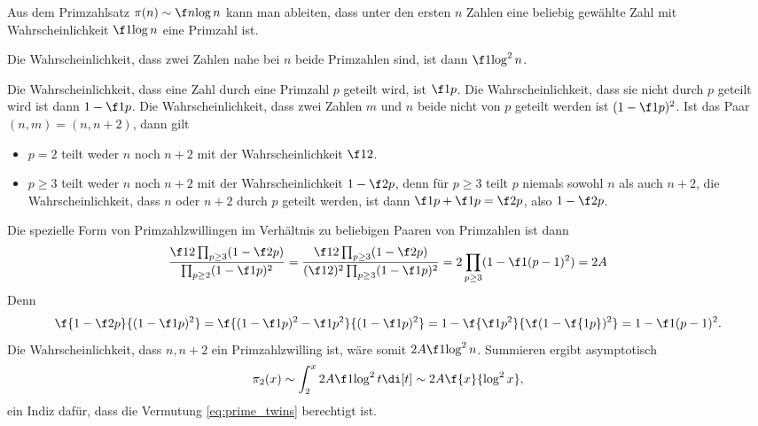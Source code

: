 \begin{nt} \label{7.13}
	Aus dem Primzahlsatz $\pi(n) \sim \f n{\log n}$ kann man ableiten, dass unter den ersten $n$ Zahlen eine beliebig gewählte Zahl mit Wahrscheinlichkeit $\f 1{\log n}$ eine Primzahl ist.

	Die Wahrscheinlichkeit, dass zwei Zahlen nahe bei $n$ beide Primzahlen sind, ist dann $\f 1{\log^2 n}$.

	Die Wahrscheinlichkeit, dass eine Zahl durch eine Primzahl $p$ geteilt wird, ist $\f 1p$.
	Die Wahrscheinlichkeit, dass sie nicht durch $p$ geteilt wird ist dann $1 - \f 1p$.
	Die Wahrscheinlichkeit, dass zwei Zahlen $m$ und $n$ beide nicht von $p$ geteilt werden ist $(1 - \f 1p)^2$.
	Ist das Paar $(n, m) = (n, n + 2)$, dann gilt
	\begin{itemize}
		\item
			$p = 2$ teilt weder $n$ noch $n+ 2$ mit der Wahrscheinlichkeit $\f 12$.
		\item
			$p \ge 3$ teilt weder $n$ noch $n+ 2$ mit der Wahrscheinlichkeit $1 - \f 2p$, denn für $p \ge 3$ teilt $p$ niemals sowohl $n$ als auch $n + 2$, die Wahrscheinlichkeit, dass $n$ oder $n+2$ durch $p$ geteilt werden, ist dann $\f 1p + \f 1p = \f 2p$, also $1 - \f 2p$.
	\end{itemize}
	Die spezielle Form von Primzahlzwillingen im Verhältnis zu beliebigen Paaren von Primzahlen ist dann
	\begin{align*}
		\dfrac{\f 12 \prod_{p \ge 3} (1 - \f 2p)}{\prod_{p\ge 2} (1-\f 1p)^2}
		= \dfrac{\f 12 \prod_{p\ge 3} (1 - \f 2p)}{(\f 12)^2 \prod_{p\ge 3} (1-\f 1p)^2}
		= 2 \prod_{p \ge 3} (1 - \f 1{(p-1)^2}) = 2A
	\end{align*}
	Denn
	\[
		\f {1 - \f 2p}{(1 - \f 1p)^2}
		= \f{(1-\f 1p)^2 - \f 1{p^2}}{(1-\f 1p)^2}
		= 1 - \f{\f 1{p^2}}{\f (1-\f{1p})^2}
		= 1 - \f 1{(p-1)^2}.
	\]
	Die Wahrscheinlichkeit, dass $n, n+2$ ein Primzahlzwilling ist, wäre somit $2 A \f 1{\log^2 n}$.
	Summieren ergibt asymptotisch
	\[
		\pi_2(x)
		\sim
		\int_2^x 2A \f 1{\log^2 t} \di[t]
		\sim 2A \f {x}{\log^2 x},
	\]
	ein Indiz dafür, dass die Vermutung \eqref{eq:prime_twins} berechtigt ist.
\end{nt}

